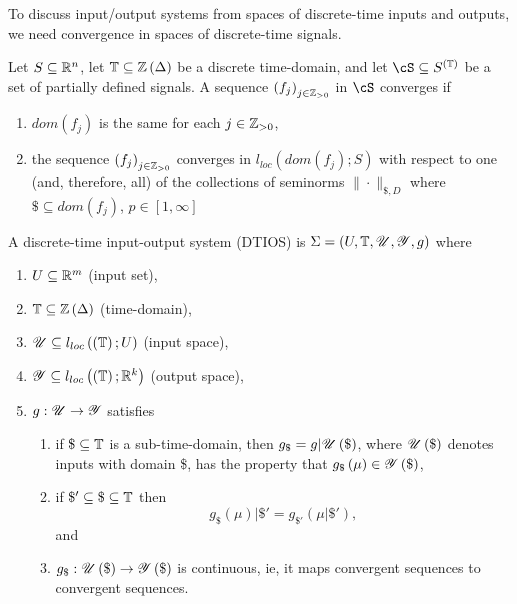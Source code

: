 
To discuss input/output systems from spaces of discrete-time inputs and outputs, we need convergence in spaces of discrete-time signals. 

\begin{definition}
	Let $S\subseteq \mathbb{R}^{n}$, let $\mathbb{T} \subseteq \mathbb{Z}\left( \Delta \right) $ be a discrete time-domain, and let $\cS\subseteq S^{\left( \tdomain  \right) }$ be a set of partially defined signals. A sequence $\left( f_{j} \right) _{j \in  \mathbb{Z} _{>0}}$ in $\cS $ converges if 
	\begin{enumerate}
		\item $dom\left( f_{j} \right) $ is the same for each $j \in \mathbb{Z}_{>0}$, 
		\item the sequence $\left( f_{j} \right) _{j \in  \mathbb{Z} _{>0}}$ converges in $l_{loc}\left( dom\left( f_{j} \right) ; S \right) $ with respect to one (and, therefore, all) of the collections of seminorms $\|\cdot\|_{\$, D}$ where $\$ \subseteq dom\left( f_{j} \right) $, $p \in \left[ 1, \infty \right] $
	\end{enumerate}
\end{definition}

\begin{definition}
	A discrete-time input-output system (DTIOS) is $\Sigma = \left( U, \mathbb{T} , \mathscr{U}, \mathscr{Y}, g \right) $ where 
	\begin{enumerate}
		\item $U \subseteq \mathbb{R}^{m}$ (input set), 
		\item $\mathbb{T} \subseteq \mathbb{Z}\left( \Delta \right) $ (time-domain), 
		\item $\mathscr{U} \subseteq l_{loc}\left( \left( \mathbb{T}  \right) ; U \right) $ (input space), 
		\item $\mathscr{Y}\subseteq l_{loc}\left( \left( \mathbb{T}  \right) ; \mathbb{R}^{k} \right) $ (output space), 
		\item $g : \mathscr{U} \to \mathscr{Y}$ satisfies 
			\begin{enumerate}
				\item if $\$ \subseteq \mathbb{T} $ is a sub-time-domain, then $g_{\$} = g | \mathscr{U}\left( \$ \right) $, where $\mathscr{U} \left( \$ \right) $ denotes inputs with domain \$, has the property that $g_{\$}\left( \mu \right) \in \mathscr{Y}\left( \$ \right) $, 
				\item if $\$ ' \subseteq \$ \subseteq \mathbb{T} $ then 
					\[
						g_{\$}\left( \mu \right) | \$ ' = g_{\$ '}\left( \mu | \$ ' \right) 
					,\] and 
				\item $g_{\$} : \mathscr{U}\left( \$ \right)  \to \mathscr{Y}\left( \$ \right) $ is continuous, ie, it maps convergent sequences to convergent sequences. 
			\end{enumerate}
	\end{enumerate}
\end{definition}

